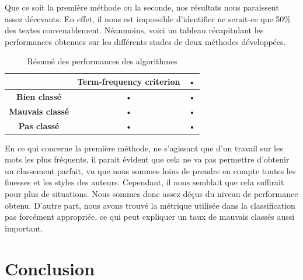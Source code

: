 \documentclass[a4paper,12pt]{report}
\begin{document}
Que ce soit la première méthode ou la seconde, nos résultats nous paraissent assez décevants. En effet, il nous est impossible d'identifier ne serait-ce que 50\% des textes convenablement. Néanmoins, voici un tableau récapitulant les performances obtenues sur les différents stades de deux méthodes développées.



\begin{table}[H]
\centering
\begin{tabular}{|c|c|c|}
\hline 
 & \textbf{Term-frequency criterion} & • \\ 
\hline 
\textbf{Bien classé} & • & • \\ 
\hline 
\textbf{Mauvais classé} & • & • \\ 
\hline 
\textbf{Pas classé} & • & • \\ 
\hline 
\end{tabular} 
\caption{Résumé des performances des algorithmes}
\end{table}


En ce qui concerne la première méthode, ne s'agissant que d'un travail sur les mots les plus fréquents, il parait évident que cela ne va pas permettre d'obtenir un classement parfait, vu que nous sommes loins de prendre en compte toutes les finesses et les styles des auteurs. Cependant, il nous semblait que cela suffirait pour plus de situations. Nous sommes donc assez déçus du niveau de performance obtenu. D'autre part, nous avons trouvé la métrique utilisée dans la classification pas forcément appropriée, ce qui peut expliquer un taux de mauvais classés aussi important.


\section*{Conclusion}
\end{document}
